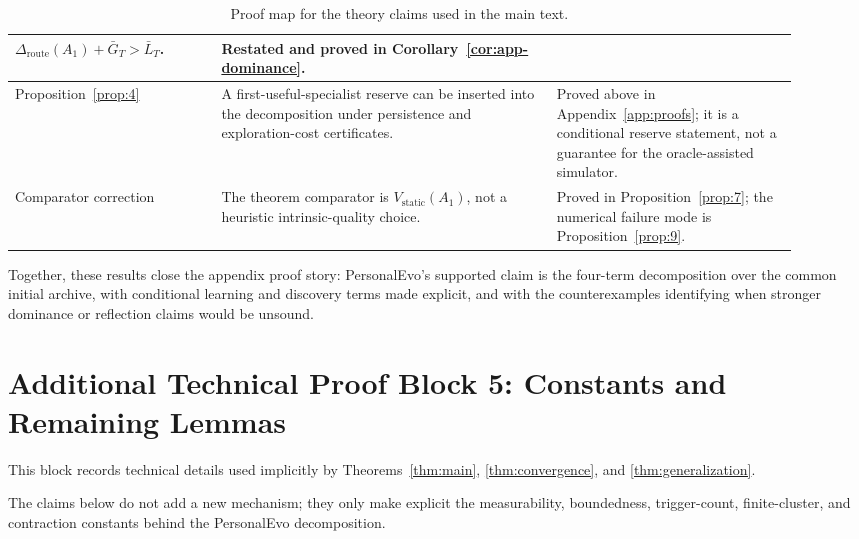 \documentclass{article} %
\begin{document}
\begin{table}[h]
\begin{tabular}{p{0.24\linewidth}p{0.39\linewidth}p{0.28\linewidth}}
\(\Delta_{\mathrm{route}}(A_1)+\bar G_T>\bar L_T\). &
Restated and proved in Corollary~\ref{cor:app-dominance}. \\
\midrule
Proposition~\ref{prop:4} &
A first-useful-specialist reserve can be inserted into the decomposition under persistence and exploration-cost certificates. &
Proved above in Appendix~\ref{app:proofs}; it is a conditional reserve statement, not a guarantee for the oracle-assisted simulator. \\
\midrule
Comparator correction &
The theorem comparator is \(V_{\mathrm{static}}(A_1)\), not a heuristic intrinsic-quality choice. &
Proved in Proposition~\ref{prop:7}; the numerical failure mode is Proposition~\ref{prop:9}. \\
\bottomrule
\end{tabular}
\caption{Proof map for the theory claims used in the main text.}
\label{tab:app-claim-map}
\end{table}

Together, these results close the appendix proof story: PersonalEvo's supported claim is the four-term decomposition over the common initial archive, with conditional learning and discovery terms made explicit, and with the counterexamples identifying when stronger dominance or reflection claims would be unsound.

\section{Additional Technical Proof Block 5: Constants and Remaining Lemmas}

\label{app:proofs-extra}

This block records technical details used implicitly by Theorems~\ref{thm:main}, \ref{thm:convergence}, and \ref{thm:generalization}.

The claims below do not add a new mechanism; they only make explicit the measurability, boundedness, trigger-count, finite-cluster, and contraction constants behind the PersonalEvo decomposition.
\end{document}
